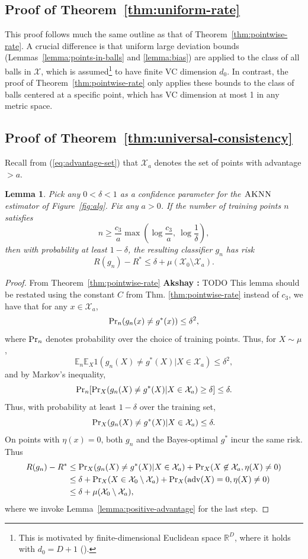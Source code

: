 \documentclass{article}
\def\pr{{\rm Pr}}
\def\E{{\mathbb E}}
\def\X{{\mathcal X}}
\def\adv{{\rm adv}}
\newcommand{\algname}{\textsc{AKNN}}
\newtheorem{lemma}[theorem]{Lemma}
\newcommand{\comment}[3]{{\color{#1} {\bf #2 :} #3}}
\newcommand{\akshay}[1]{\comment{blue}{Akshay}{#1}}
\newcommand{\sanjoy}[1]{\comment{orange}{Sanjoy}{#1}}
\begin{document}
\subsection{Proof of Theorem~\ref{thm:uniform-rate}}

This proof follows much the same outline as that of Theorem~\ref{thm:pointwise-rate}. A crucial difference is that uniform large deviation bounds (Lemmas~\ref{lemma:points-in-balls} and \ref{lemma:bias}) are applied to the class of all balls in $\X$, which is assumed\footnote{This is motivated by finite-dimensional Euclidean space $\mathbb{R}^{D}$, where it holds with $d_0 = D+1$ (\cite{dudley79}).} to have finite VC dimension $d_0$. In contrast, the proof of Theorem~\ref{thm:pointwise-rate} only applies these bounds to the class of balls centered at a specific point, which has VC dimension at most 1 in any metric space.




\subsection{Proof of Theorem~\ref{thm:universal-consistency}}

Recall from (\ref{eq:advantage-set}) that $\X_a$ denotes the set of points with advantage $> a$.
\begin{lemma}
Pick any $0 < \delta < 1$ as a confidence parameter for the $\algname$ estimator of Figure~\ref{fig:alg}. Fix any $a > 0$. If the number of training points $n$ satisfies
$$ n \geq \frac{c_3}{a} \max\left(\log \frac{c_3}{a}, \ \log \frac{1}{\delta} \right), $$
then with probability at least $1-\delta$, the resulting classifier $g_n$ has risk
$$ R(g_n) - R^* \leq \delta + \mu(\X_0 \setminus \X_a) .$$
\label{lemma:advantage-set-convergence}
\end{lemma}
\begin{proof}
From Theorem~\ref{thm:pointwise-rate} \akshay{TODO This lemma should be restated using the constant $C$ from Thm. \ref{thm:pointwise-rate} instead of $c_3$}, we have that for any $x \in \X_a$, 
$$ \pr_n(g_n(x) \neq g^*(x)) \leq \delta^2 ,$$
where $\pr_n$ denotes probability over the choice of training points. Thus, for $X \sim \mu$,
$$ \E_n \E_X 1(g_n(X) \neq g^*(X) | X \in \X_a) \leq \delta^2 ,$$
and by Markov's inequality,
$$ \pr_n [\pr_X (g_n(X) \neq g^*(X) |  X \in \X_a) \geq \delta] \leq \delta.$$
Thus, with probability at least $1-\delta$ over the training set,
$$\pr_X (g_n(X) \neq g^*(X) |  X \in \X_a) \leq \delta .$$
On points with $\eta(x) = 0$, both $g_n$ and the Bayes-optimal $g^*$ incur the same risk. Thus
\begin{align*}
R(g_n) - R^*
&\leq \pr_X(g_n(X) \neq g^*(X) | X \in \X_a) + \pr_X(X \not\in \X_a, \eta(X) \neq 0) \\ 
&\leq \delta + \pr_X(X \in \X_0 \setminus \X_a) + \pr_X(\adv(X) = 0, \eta(X) \neq 0) \\ 
&\leq \delta + \mu(\X_0 \setminus \X_a),
\end{align*}
where we invoke Lemma~\ref{lemma:positive-advantage} for the last step.
\end{proof}
\end{document}
